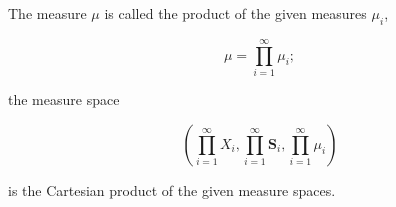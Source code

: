 The measure $\mu$ is called the product of the given measures $\mu_i$,

$$\mu = \prod_{i=1}^{\infty} \mu_i;$$

the measure space

$$\left( \prod_{i=1}^{\infty} X_i, \prod_{i=1}^{\infty} \mathbf{S}_i, \prod_{i=1}^{\infty} \mu_i \right)$$

is the Cartesian product of the given measure spaces.
